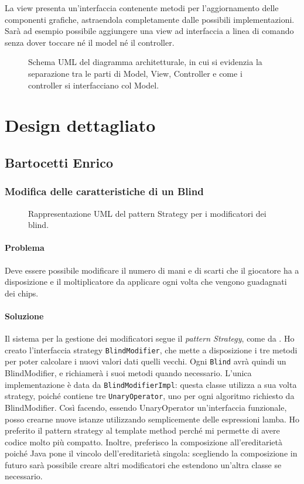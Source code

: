 \documentclass[a4paper,12pt]{report}
\begin{document}
La view presenta un’interfaccia contenente metodi per l’aggiornamento delle componenti grafiche, astraendola completamente dalle possibili implementazioni.
Sarà ad esempio possibile aggiungere una view ad interfaccia a linea di comando senza dover toccare né il model né il controller.

\begin{figure}[H]
	\centering{}
	
	\caption{Schema UML del diagramma architetturale, in cui si evidenzia la separazione tra le parti di Model, View, Controller e come i controller si interfacciano col Model.}
	\label{img:architetturamvc}
\end{figure}

\section{Design dettagliato}

\subsection{Bartocetti Enrico}

\subsubsection*{Modifica delle caratteristiche di un Blind}
\begin{figure}[H]
	\centering{}
	
	\caption{Rappresentazione UML del pattern Strategy per i modificatori dei blind.}
	\label{img:blindmodifier}
\end{figure}
\paragraph{Problema}
Deve essere possibile modificare il numero di mani e di scarti che il giocatore ha a disposizione e il moltiplicatore da applicare ogni volta che vengono guadagnati dei chips. 
\paragraph{Soluzione}
Il sistema per la gestione dei modificatori segue il \textit{pattern Strategy}, come da . Ho creato l’interfaccia strategy \texttt{BlindModifier}, che mette a disposizione i tre metodi per poter calcolare i nuovi valori dati quelli vecchi.
Ogni \texttt{Blind} avrà quindi un BlindModifier, e richiamerà i suoi metodi quando necessario. L’unica implementazione è data da \texttt{BlindModifierImpl}: questa classe utilizza a sua volta strategy, poiché contiene tre \texttt{UnaryOperator}, uno per ogni algoritmo richiesto da BlindModifier.
Così facendo, essendo UnaryOperator un’interfaccia funzionale, posso crearne nuove istanze utilizzando semplicemente delle espressioni lamba. Ho preferito il pattern strategy al template method perché mi permette di avere codice molto più compatto.
Inoltre, preferisco la composizione all’ereditarietà poiché Java pone il vincolo dell’ereditarietà singola: scegliendo la composizione in futuro sarà possibile creare altri modificatori che estendono un’altra classe se necessario.
\end{document}
